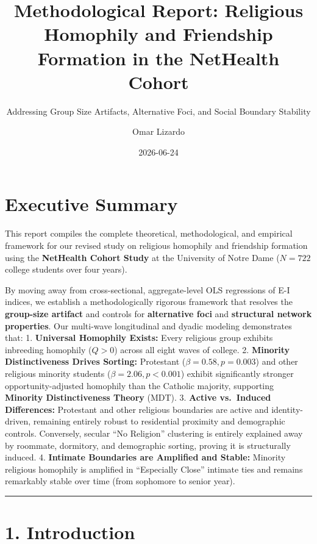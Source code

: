 \documentclass[
  letterpaper,
  DIV=11,
  numbers=noendperiod]{scrartcl}
\title{Methodological Report: Religious Homophily and Friendship
Formation in the NetHealth Cohort}
\subtitle{Addressing Group Size Artifacts, Alternative Foci, and Social
Boundary Stability}
\author{Omar Lizardo}
\date{2026-06-24}
\begin{document}
\maketitle


\section{Executive Summary}\label{executive-summary}

This report compiles the complete theoretical, methodological, and
empirical framework for our revised study on religious homophily and
friendship formation using the \textbf{NetHealth Cohort Study} at the
University of Notre Dame (\(N = 722\) college students over four years).

By moving away from cross-sectional, aggregate-level OLS regressions of
E-I indices, we establish a methodologically rigorous framework that
resolves the \textbf{group-size artifact} and controls for
\textbf{alternative foci} and \textbf{structural network properties}.
Our multi-wave longitudinal and dyadic modeling demonstrates that: 1.
\textbf{Universal Homophily Exists:} Every religious group exhibits
inbreeding homophily (\(Q > 0\)) across all eight waves of college. 2.
\textbf{Minority Distinctiveness Drives Sorting:} Protestant
(\(\beta = 0.58, p = 0.003\)) and other religious minority students
(\(\beta = 2.06, p < 0.001\)) exhibit significantly stronger
opportunity-adjusted homophily than the Catholic majority, supporting
\textbf{Minority Distinctiveness Theory} (MDT). 3. \textbf{Active
vs.~Induced Differences:} Protestant and other religious boundaries are
active and identity-driven, remaining entirely robust to residential
proximity and demographic controls. Conversely, secular ``No Religion''
clustering is entirely explained away by roommate, dormitory, and
demographic sorting, proving it is structurally induced. 4.
\textbf{Intimate Boundaries are Amplified and Stable:} Minority
religious homophily is amplified in ``Especially Close'' intimate ties
and remains remarkably stable over time (from sophomore to senior year).

\begin{center}\rule{0.5\linewidth}{0.5pt}\end{center}

\section{1. Introduction}\label{introduction}
\end{document}
